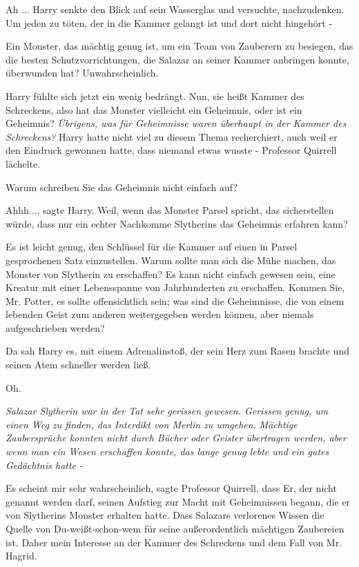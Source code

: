 \glqq{}Ah ...\grqq{} Harry senkte den Blick auf sein Wasserglas und versuchte,
nachzudenken. \glqq{}Um jeden zu töten, der in die Kammer gelangt ist und dort
nicht hingehört -\grqq{}

\glqq{}Ein Monster, das mächtig genug ist, um ein Team von Zauberern zu besiegen,
das die besten Schutzvorrichtungen, die Salazar an seiner Kammer anbringen
konnte, überwunden hat? Unwahrscheinlich.\grqq{}

Harry fühlte sich jetzt ein wenig bedrängt. \glqq{}Nun, sie heißt Kammer des
Schreckens, also hat das Monster vielleicht ein Geheimnis, oder ist ein
Geheimnis?\grqq{} \emph{Übrigens, was für Geheimnisse waren überhaupt in der Kammer
des Schreckens?} Harry hatte nicht viel zu diesem Thema recherchiert, auch weil
er den Eindruck gewonnen hatte, dass niemand etwas wusste - Professor Quirrell
lächelte.

\glqq{}Warum schreiben Sie das Geheimnis nicht einfach auf?\grqq{}

\glqq{}Ahhh...\grqq{}, sagte Harry. \glqq{}Weil, wenn das Monster Parsel spricht,
das sicherstellen würde, dass nur ein echter Nachkomme Slytherins das Geheimnis
erfahren kann?\grqq{}

\glqq{}Es ist leicht genug, den Schlüssel für die Kammer auf einen in Parsel
gesprochenen Satz einzustellen. Warum sollte man sich die Mühe machen, das
Monster von Slytherin zu erschaffen? Es kann nicht einfach gewesen sein, eine
Kreatur mit einer Lebensspanne von Jahrhunderten zu erschaffen. Kommen Sie, Mr.
Potter, es sollte offensichtlich sein; was sind die Geheimnisse, die von einem
lebenden Geist zum anderen weitergegeben werden können, aber niemals
aufgeschrieben werden?\grqq{}

Da sah Harry es, mit einem Adrenalinstoß, der sein Herz zum Rasen brachte und
seinen Atem schneller werden ließ.

\glqq{}Oh.\grqq{}

\emph{Salazar Slytherin war in der Tat sehr gerissen gewesen. Gerissen genug,
um einen Weg zu finden, das Interdikt von Merlin zu umgehen.}
\emph{Mächtige Zaubersprüche konnten nicht durch Bücher oder Geister übertragen
werden, aber wenn man ein Wesen erschaffen konnte, das lange genug lebte und ein
gutes Gedächtnis hatte -}

\glqq{}Es scheint mir sehr wahrscheinlich\grqq{}, sagte Professor Quirrell, \glqq{}
dass Er, der nicht genannt werden darf, seinen Aufstieg zur Macht mit
Geheimnissen begann, die er von Slytherins Monster erhalten hatte. Dass Salazars
verlorenes Wissen die Quelle von Du-weißt-schon-wem für seine außerordentlich
mächtigen Zaubereien ist. Daher mein Interesse an der Kammer des Schreckens und
dem Fall von Mr. Hagrid.\grqq{}

